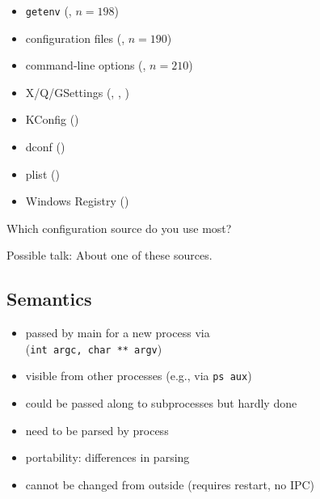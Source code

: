 \documentclass{beamer}
\begin{document}
\begin{frame}
	\methodQuestion{} 
	\begin{itemize}
	\item \texttt{getenv} (, $n=198$)
	\item configuration files (, $n=190$)
	\item command-line options (, $n=210$)
	\item X/Q/GSettings (, , )
	\item KConfig ()
	\item dconf ()
	\item plist ()
	\item Windows Registry ()
	\end{itemize}
\end{frame}

\begin{assignment}
	\begin{task}
	Which configuration source do you use most?
	\end{task}

	\begin{task}
	Possible talk: About one of these sources.
	\end{task}
\end{assignment}

\subsection{Semantics}

\begin{frame}
	\begin{itemize}
	\item passed by main for a new process via \\ (\texttt{int argc, char ** argv})
	\item visible from other processes (e.g., via \texttt{ps aux})
	\item could be passed along to subprocesses but hardly done
	\item need to be parsed by process
	\item portability: differences in parsing
	\item cannot be changed from outside (requires restart, no IPC)
	\end{itemize}
\end{frame}

\end{document}
